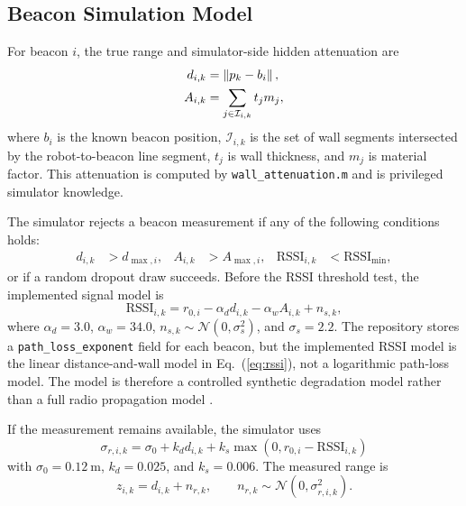 \subsection{Beacon Simulation Model}

For beacon \(i\), the true range and simulator-side hidden attenuation are
\begin{align}
    d_{i,k} &= \left\lVert p_k-b_i \right\rVert,\\
    A_{i,k} &= \sum_{j\in\mathcal{I}_{i,k}} t_j m_j,
\end{align}
where \(b_i\) is the known beacon position, \(\mathcal{I}_{i,k}\) is the set of wall segments intersected by the robot-to-beacon line segment, \(t_j\) is wall thickness, and \(m_j\) is material factor. This attenuation is computed by \texttt{wall\_attenuation.m} and is privileged simulator knowledge.

The simulator rejects a beacon measurement if any of the following conditions holds:
\begin{align}
    d_{i,k} &> d_{\max,i},&
    A_{i,k} &> A_{\max,i},&
    \mathrm{RSSI}_{i,k} &< \mathrm{RSSI}_{\min},
\end{align}
or if a random dropout draw succeeds. Before the RSSI threshold test, the implemented signal model is
\begin{equation}
    \mathrm{RSSI}_{i,k}
    =
    r_{0,i}
    -\alpha_d d_{i,k}
    -\alpha_w A_{i,k}
    + n_{s,k},
\label{eq:rssi}
\end{equation}
where \(\alpha_d=3.0\), \(\alpha_w=34.0\), \(n_{s,k}\sim\mathcal{N}(0,\sigma_s^2)\), and \(\sigma_s=2.2\). The repository stores a \texttt{path\_loss\_exponent} field for each beacon, but the implemented RSSI model is the linear distance-and-wall model in Eq.~(\ref{eq:rssi}), not a logarithmic path-loss model. The model is therefore a controlled synthetic degradation model rather than a full radio propagation model \citep{rappaport2002wireless}.

If the measurement remains available, the simulator uses
\begin{equation}
    \sigma_{r,i,k}
    =
    \sigma_{0}
    + k_d d_{i,k}
    + k_s\max(0,r_{0,i}-\mathrm{RSSI}_{i,k})
\end{equation}
with \(\sigma_0=0.12~\mathrm{m}\), \(k_d=0.025\), and \(k_s=0.006\). The measured range is
\begin{equation}
    z_{i,k}=d_{i,k}+n_{r,k},\qquad
    n_{r,k}\sim\mathcal{N}(0,\sigma_{r,i,k}^{2}).
\end{equation}

